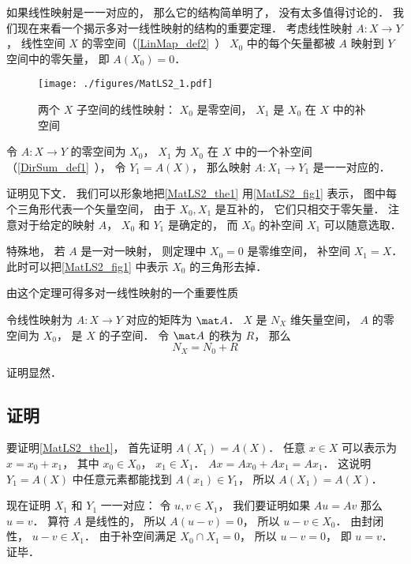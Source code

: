 

如果线性映射是一一对应的， 那么它的结构简单明了， 没有太多值得讨论的． 我们现在来看一个揭示多对一线性映射的结构的重要定理． 考虑线性映射 $A:X\to Y$， 线性空间 $X$ 的零空间（\autoref{LinMap_def2}~） $X_0$ 中的每个矢量都被 $A$ 映射到 $Y$ 空间中的零矢量， 即 $A(X_0) = \qty{0}$．

\begin{figure}[ht]
\centering
\texttt{[image: ./figures/MatLS2\_1.pdf]}
\caption{两个 $X$ 子空间的线性映射： $X_0$ 是零空间， $X_1$ 是 $X_0$ 在 $X$ 中的补空间} \label{MatLS2_fig1}
\end{figure}

\begin{theorem}{}\label{MatLS2_the1}
令 $A:X \to Y$ 的零空间为 $X_0$， $X_1$ 为 $X_0$ 在 $X$ 中的一个补空间（\autoref{DirSum_def1}~）， 令 $Y_1 = A(X)$， 那么映射 $A:X_1\to Y_1$ 是一一对应的．
\end{theorem}
证明见下文． 我们可以形象地把\autoref{MatLS2_the1} 用\autoref{MatLS2_fig1} 表示， 图中每个三角形代表一个矢量空间， 由于 $X_0, X_1$ 是互补的， 它们只相交于零矢量． 注意对于给定的映射 $A$， $X_0$ 和 $Y_1$ 是确定的， 而 $X_0$ 的补空间 $X_1$ 可以随意选取．

特殊地， 若 $A$ 是一对一映射， 则定理中 $X_0 = \qty{0}$ 是零维空间， 补空间 $X_1 = X$． 此时可以把\autoref{MatLS2_fig1} 中表示 $X_0$ 的三角形去掉．

由这个定理可得多对一线性映射的一个重要性质
\begin{corollary}{}
令线性映射为 $A:X\to Y$ 对应的矩阵为 $\mat A$． $X$ 是 $N_X$ 维矢量空间， $A$ 的零空间为 $X_0$， 是 $X$ 的子空间． 令 $\mat A$ 的秩为 $R$， 那么
\begin{equation}\label{MatLS2_eq1}
N_X = N_0 + R
\end{equation}
\end{corollary}
证明显然．


\subsection{证明}
要证明\autoref{MatLS2_the1}， 首先证明 $A(X_1) = A(X)$． 任意 $x\in X$ 可以表示为 $x = x_0 + x_1$， 其中 $x_0\in X_0$， $x_1\in X_1$． $Ax = A x_0 + A x_1 = A x_1$． 这说明 $Y_1 = A(X)$ 中任意元素都能找到 $A(x_1) \in Y_1$， 所以 $A(X_1) = A(X)$．

现在证明 $X_1$ 和 $Y_1$ 一一对应： 令 $u, v \in X_1$， 我们要证明如果 $Au = Av$ 那么 $u = v$． 算符 $A$ 是线性的， 所以 $A(u-v) = 0$， 所以 $u - v \in X_0$． 由封闭性， $u - v \in X_1$． 由于补空间满足 $X_0 \cap X_1 = \qty{0}$， 所以 $u - v = 0$， 即 $u = v$． 证毕．

